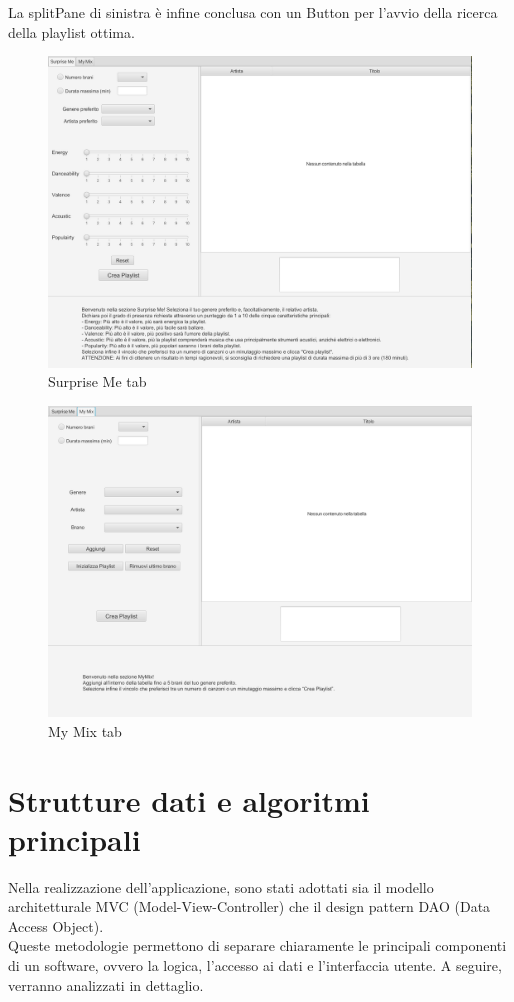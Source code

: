 \documentclass[12pt, a4paper]{article}
\begin{document}
La splitPane di sinistra è infine conclusa con un Button per l'avvio della ricerca della playlist ottima.

\newpage

\begin{figure}[ht]
\centering
  \includegraphics[clip, width=0.65\linewidth]{images/surpriseMeTotal.png}
  \caption{Surprise Me tab}
\end{figure}
  
\begin{figure}[ht]  
\centering
  \includegraphics[clip, width=0.65\linewidth]{images/myMixTotal.png}
  \caption{My Mix tab}
\end{figure}


\newpage

\section{Strutture dati e algoritmi principali}

Nella realizzazione dell'applicazione, sono stati adottati sia il modello architetturale MVC (Model-View-Controller) che il design pattern DAO (Data Access Object). \\Queste metodologie permettono di separare chiaramente le principali componenti di un software, ovvero la logica, l'accesso ai dati e l'interfaccia utente. A seguire, verranno analizzati in dettaglio.
\end{document}
